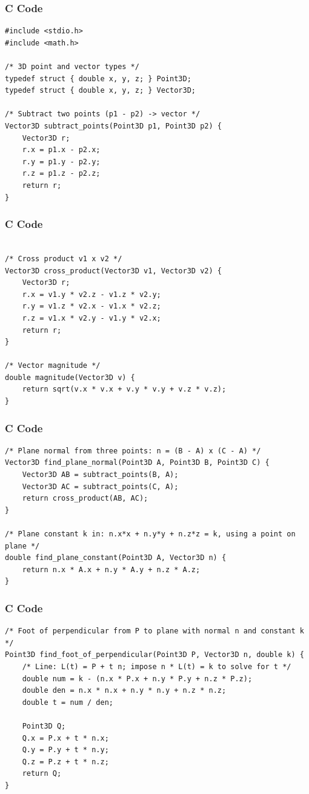 \documentclass{beamer}
\begin{document}
\begin{frame}[fragile]
    \frametitle{C Code}
    \begin{lstlisting}
#include <stdio.h>
#include <math.h>

/* 3D point and vector types */
typedef struct { double x, y, z; } Point3D;
typedef struct { double x, y, z; } Vector3D;

/* Subtract two points (p1 - p2) -> vector */
Vector3D subtract_points(Point3D p1, Point3D p2) {
    Vector3D r;
    r.x = p1.x - p2.x;
    r.y = p1.y - p2.y;
    r.z = p1.z - p2.z;
    return r;
}
    \end{lstlisting}
\end{frame}

\begin{frame}[fragile]
    \frametitle{C Code}
    \begin{lstlisting}

/* Cross product v1 x v2 */
Vector3D cross_product(Vector3D v1, Vector3D v2) {
    Vector3D r;
    r.x = v1.y * v2.z - v1.z * v2.y;
    r.y = v1.z * v2.x - v1.x * v2.z;
    r.z = v1.x * v2.y - v1.y * v2.x;
    return r;
}

/* Vector magnitude */
double magnitude(Vector3D v) {
    return sqrt(v.x * v.x + v.y * v.y + v.z * v.z);
}
    \end{lstlisting}
\end{frame}

\begin{frame}[fragile]
    \frametitle{C Code}
    \begin{lstlisting}
/* Plane normal from three points: n = (B - A) x (C - A) */
Vector3D find_plane_normal(Point3D A, Point3D B, Point3D C) {
    Vector3D AB = subtract_points(B, A);
    Vector3D AC = subtract_points(C, A);
    return cross_product(AB, AC);
}

/* Plane constant k in: n.x*x + n.y*y + n.z*z = k, using a point on plane */
double find_plane_constant(Point3D A, Vector3D n) {
    return n.x * A.x + n.y * A.y + n.z * A.z;
}
    \end{lstlisting}
\end{frame}

\begin{frame}[fragile]
    \frametitle{C Code}
    \begin{lstlisting}
/* Foot of perpendicular from P to plane with normal n and constant k */
Point3D find_foot_of_perpendicular(Point3D P, Vector3D n, double k) {
    /* Line: L(t) = P + t n; impose n * L(t) = k to solve for t */
    double num = k - (n.x * P.x + n.y * P.y + n.z * P.z);
    double den = n.x * n.x + n.y * n.y + n.z * n.z;
    double t = num / den;

    Point3D Q;
    Q.x = P.x + t * n.x;
    Q.y = P.y + t * n.y;
    Q.z = P.z + t * n.z;
    return Q;
}

    \end{lstlisting}
\end{frame}
\end{document}
